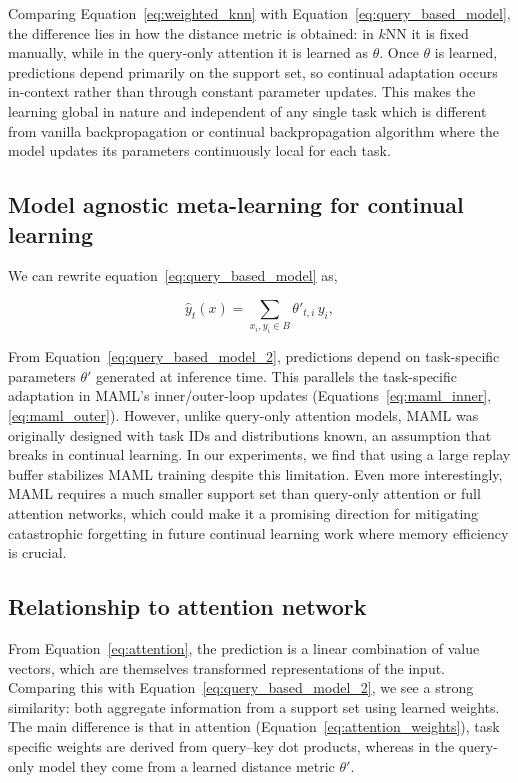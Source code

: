 \documentclass{article}
\begin{document}
Comparing Equation~\ref{eq:weighted_knn} with Equation~\ref{eq:query_based_model}, the difference lies in how the distance metric is obtained: in $k$NN it is fixed manually, while in the query-only attention it is learned as $\theta$.  
Once $\theta$ is learned, predictions depend primarily on the support set, so continual adaptation occurs in-context rather than through constant parameter updates.  
This makes the learning global in nature and independent of any single task which is different from vanilla backpropagation or continual backpropagation algorithm where the model updates its parameters continuously local for each task.


\subsection{Model agnostic meta-learning for continual learning}
We can rewrite equation~\ref{eq:query_based_model} as, 


\begin{equation}
\hat{y}_t(x) = \sum_{x_i, y_i \in B} \theta'_{t,i} \, y_i,
\label{eq:query_based_model_2}
\end{equation}


From Equation~\ref{eq:query_based_model_2}, predictions depend on task-specific parameters $\theta'$ generated at inference time.
This parallels the task-specific adaptation in MAML’s inner/outer-loop updates (Equations~\ref{eq:maml_inner}, \ref{eq:maml_outer}).
However, unlike query-only attention models, MAML was originally designed with task IDs and distributions known, an assumption that breaks in continual learning.
In our experiments, we find that using a large replay buffer stabilizes MAML training despite this limitation.
Even more interestingly, MAML requires a much smaller support set than query-only attention or full attention networks, which could make it a promising direction for mitigating catastrophic forgetting in future continual learning work where memory efficiency is crucial.



\subsection{Relationship to attention network}
From Equation~\ref{eq:attention}, the prediction is a linear combination of value vectors, which are themselves transformed representations of the input.  
Comparing this with Equation~\ref{eq:query_based_model_2}, we see a strong similarity: both aggregate information from a support set using learned weights.  
The main difference is that in attention (Equation~\ref{eq:attention_weights}), task specific weights are derived from query–key dot products, whereas in the query-only model they come from a learned distance metric $\theta'$.  
\end{document}
